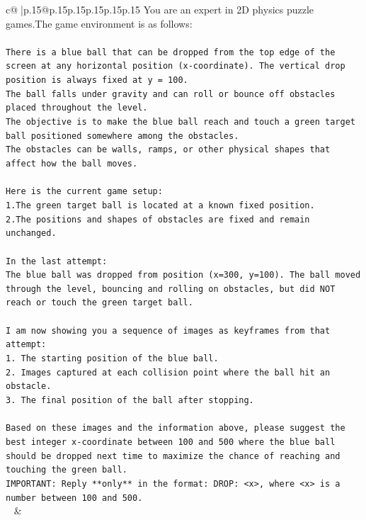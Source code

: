 \documentclass{article}
\begin{document}
{\begin{supertabular}{c@{$\;$}|p{.15\linewidth}@{}p{.15\linewidth}p{.15\linewidth}p{.15\linewidth}p{.15\linewidth}p{.15\linewidth}}
{{{	 You are an expert in 2D physics puzzle games.The game environment is as follows:\\ \tt \\ \tt There is a blue ball that can be dropped from the top edge of the screen at any horizontal position (x-coordinate). The vertical drop position is always fixed at y = 100.\\ \tt The ball falls under gravity and can roll or bounce off obstacles placed throughout the level.\\ \tt The objective is to make the blue ball reach and touch a green target ball positioned somewhere among the obstacles.\\ \tt The obstacles can be walls, ramps, or other physical shapes that affect how the ball moves.\\ \tt \\ \tt Here is the current game setup:\\ \tt 1.The green target ball is located at a known fixed position.\\ \tt 2.The positions and shapes of obstacles are fixed and remain unchanged.\\ \tt \\ \tt In the last attempt:\\ \tt The blue ball was dropped from position (x=300, y=100). The ball moved through the level, bouncing and rolling on obstacles, but did NOT reach or touch the green target ball.\\ \tt \\ \tt I am now showing you a sequence of images as keyframes from that attempt:\\ \tt 1. The starting position of the blue ball.\\ \tt 2. Images captured at each collision point where the ball hit an obstacle.\\ \tt 3. The final position of the ball after stopping.\\ \tt \\ \tt Based on these images and the information above, please suggest the best integer x-coordinate between 100 and 500 where the blue ball should be dropped next time to maximize the chance of reaching and touching the green ball.\\ \tt IMPORTANT: Reply **only** in the format: DROP: <x>, where <x> is a number between 100 and 500.\\ \tt  
	  } 
	   } 
	   } 
	 & \\ 
 

    \theutterance {}  


\end{supertabular}}
\end{document}
